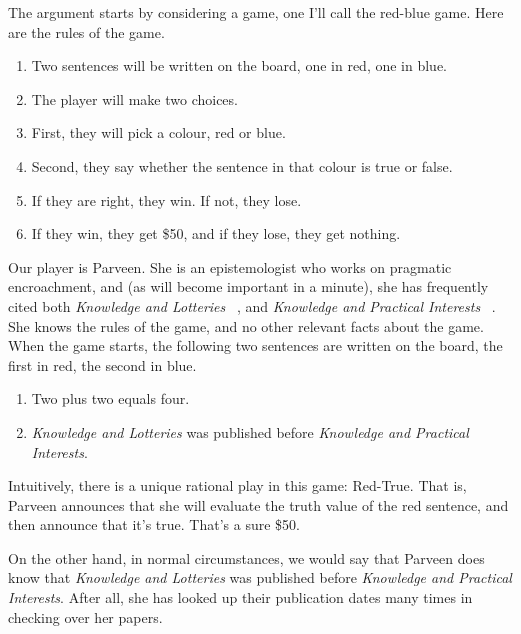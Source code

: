 \documentclass{article}
\begin{document}
The argument starts by considering a game, one I'll call the red-blue game. Here are the rules of the game.

\begin{enumerate}
\item Two sentences will be written on the board, one in red, one in blue.

\item The player will make two choices.

\item First, they will pick a colour, red or blue.

\item Second, they say whether the sentence in that colour is true or false.

\item If they are right, they win. If not, they lose.

\item If they win, they get \$50, and if they lose, they get nothing.

\end{enumerate}
Our player is Parveen. She is an epistemologist who works on pragmatic encroachment, and (as will become important in a minute), she has frequently cited both \emph{Knowledge and Lotteries} ~\citep{Hawthorne2004}, and \emph{Knowledge and Practical Interests} ~\citep{Stanley2005}. She knows the rules of the game, and no other relevant facts about the game. When the game starts, the following two sentences are written on the board, the first in red, the second in blue.

\begin{enumerate}
\item Two plus two equals four.

\item \emph{Knowledge and Lotteries} was published before \emph{Knowledge and Practical Interests}.

\end{enumerate}
Intuitively, there is a unique rational play in this game: Red-True. That is, Parveen announces that she will evaluate the truth value of the red sentence, and then announce that it's true. That's a sure \$50.

On the other hand, in normal circumstances, we would say that Parveen does know that \emph{Knowledge and Lotteries} was published before \emph{Knowledge and Practical Interests}. After all, she has looked up their publication dates many times in checking over her papers. 
\end{document}
